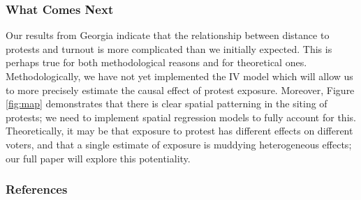 \documentclass[
  12pt,
]{article}
\begin{document}
\begin{singlespace}

\end{singlespace}

\hypertarget{what-comes-next}{%
\subsubsection*{What Comes Next}\label{what-comes-next}}

Our results from Georgia indicate that the relationship between distance to protests and turnout is more complicated than we initially expected. This is perhaps true for both methodological reasons and for theoretical ones. Methodologically, we have not yet implemented the IV model which will allow us to more precisely estimate the causal effect of protest exposure. Moreover, Figure \ref{fig:map} demonstrates that there is clear spatial patterning in the siting of protests; we need to implement spatial regression models to fully account for this. Theoretically, it may be that exposure to protest has different effects on different voters, and that a single estimate of exposure is muddying heterogeneous effects; our full paper will explore this potentiality.

\newpage

\hypertarget{references}{%
\subsubsection*{References}\label{references}}
\end{document}
